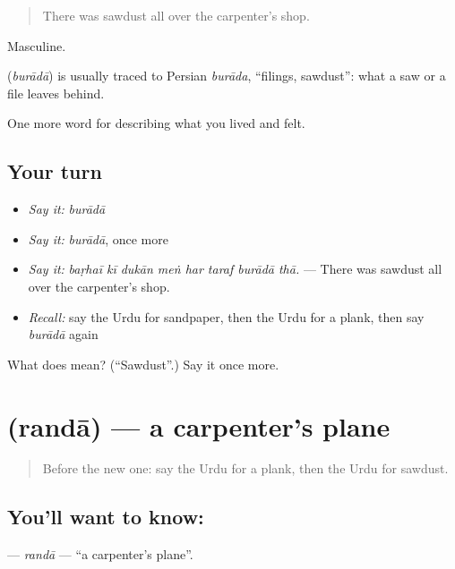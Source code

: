 \begin{quote}
There was sawdust all over the carpenter's shop.
\end{quote}

Masculine.

\begin{cousinweb}
\textbf{} (\emph{burādā}) is usually traced to Persian \emph{burāda}, \textquotedblleft{}filings, sawdust\textquotedblright{}: what a saw or a file leaves behind.
\end{cousinweb}

\begin{grammarlens}[title={What you've built}]
One more word for describing what you lived and felt.
\end{grammarlens}

\subsection*{Your turn}
\begin{itemize}
\raggedright
  \item \emph{Say it:} \emph{burādā}
  \item \emph{Say it:} \emph{burādā}, once more
  \item \emph{Say it:} \emph{baṛhaī kī dukān meṅ har taraf burādā thā.} — There was sawdust all over the carpenter's shop.
  \item \emph{Recall:} say the Urdu for sandpaper, then the Urdu for a plank, then say \emph{burādā} again
\end{itemize}

\begin{tcolorbox}[breakable,colback=teal!4,colframe=teal!35!black,title={Before you move on}]
What does  mean? (\textquotedblleft{}Sawdust\textquotedblright{}.) Say it once more.
\end{tcolorbox}
\section[\texorpdfstring{\ur{رندا} (randā)}{رندا (randā)}]{ (randā) — a carpenter's plane}

\label{lesson:UR-C497-randa}



\begin{quote}
Before the new one: say the Urdu for a plank, then the Urdu for sawdust.
\end{quote}

\subsection*{You'll want to know: }
\textbf{} — \emph{randā} — \textquotedblleft{}a carpenter's plane\textquotedblright{}.


